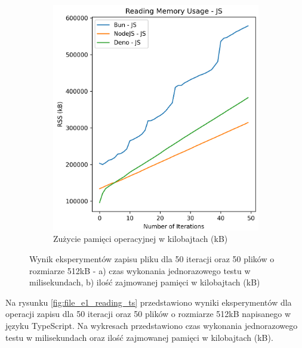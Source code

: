 \begin{figure}[H]
  \begin{subfigure}[b]{0.42\textwidth}
    \centering
    \includegraphics[width=\textwidth]{Figures/files/files_writing_50_500_50_js_memory.png}
    \caption{Zużycie pamięci operacyjnej w kilobajtach (kB)}
    \label{fig:file_e1_writing_js_memory}
  \end{subfigure}
  \caption{Wynik eksperymentów zapisu pliku dla 50 iteracji oraz 50 plików o rozmiarze 512kB - a) czas wykonania jednorazowego testu w milisekundach, b) ilość zajmowanej pamięci w kilobajtach (kB)}
  \label{fig:file_e1_writing_js}
\end{figure}

Na rysunku \ref{fig:file_e1_reading_ts} przedstawiono wyniki eksperymentów dla operacji zapisu dla 50 iteracji oraz 50 plików o rozmiarze 512kB napisanego w języku TypeScript. Na wykresach przedstawiono czas wykonania jednorazowego testu w milisekundach oraz ilość zajmowanej pamięci w kilobajtach (kB).

